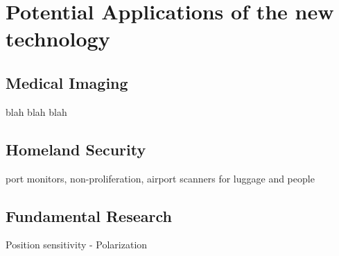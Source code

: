 \chapter{Potential Applications of the new technology}
\label{ch:Potential Applications of the new technology}

\section{Medical Imaging}
\indent blah blah blah

\section{Homeland Security}
\indent port monitors, non-proliferation, airport scanners for luggage and people

\section{Fundamental Research}
\indent Position sensitivity - Polarization



 


 